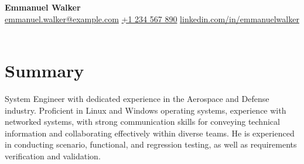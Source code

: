 \documentclass[letterpaper,10pt]{article}
\begin{document}
\begin{center}
    {\LARGE \textbf{Emmanuel Walker}} \\
    \vspace{2mm}
    \href{mailto:emmanuel.walker@example.com}{emmanuel.walker@example.com} \hfill
    \href{tel:+1234567890}{+1 234 567 890} \hfill
    \href{https://www.linkedin.com/in/emmanuelwalker}{linkedin.com/in/emmanuelwalker} \\
    \vspace{2mm}
       {}\\
   
\end{center}

\section*{Summary}
System Engineer with dedicated experience in the Aerospace and Defense industry. 
Proficient in Linux and Windows operating systems, experience with networked systems,
with strong communication skills for conveying technical information and collaborating 
effectively within diverse teams. He is experienced in conducting scenario, functional, 
and regression testing, as well as requirements verification and validation. 
\end{document}
